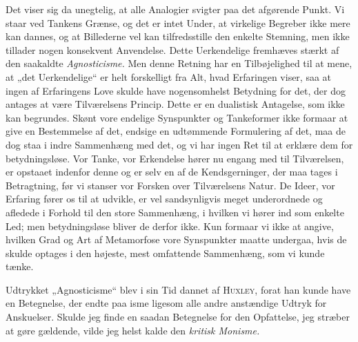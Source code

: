 \documentclass[12pt,a4paper,openany]{book}
\newcommand{\opage}[1]{\marginnote{\footnotesize\textit{[#1]}}}
\begin{document}
Det viser sig da unegtelig, at alle Analogier svigter paa det afgørende
Punkt. Vi staar ved Tankens Grænse, og det er intet Under, at virkelige
Begreber ikke mere kan dannes, og at Billederne vel kan tilfredsstille
den enkelte Stemning, men ikke tillader nogen konsekvent Anvendelse.
Dette Uerkendelige fremhæves stærkt af den saakaldte
\textit{Agnosticisme.} Men denne Retning har en Tilbøjelighed til at
mene, at „det Uerkendelige“ er helt forskelligt fra Alt, hvad Erfaringen
viser, saa at ingen af Erfaringens Love skulde have nogensomhelst
Betydning for det, der dog antages at være Tilværelsens Princip. Dette
er en dualistisk Antagelse, som ikke kan begrundes. Skønt vore endelige
Synspunkter og Tankeformer ikke formaar at give en Bestemmelse af det,
endsige en udtømmende Formulering af det, maa de dog staa i indre
Sammenhæng med det, og vi har ingen Ret til at erklære dem for
betydningsløse. Vor Tanke, vor Erkendelse hører nu engang med til
Tilværelsen, er opstaaet indenfor denne og er selv en af de
Kendsgerninger, der maa tages i Betragtning, før vi stanser vor Forsken
over Tilværelsens Natur. De Ideer, vor Erfaring fører os til at udvikle,
er vel sandsynligvis meget underordnede og afledede i Forhold til den
store Sammenhæng, i hvilken vi hører ind som enkelte Led; men
betydningsløse bliver de derfor ikke. Kun formaar vi ikke at angive,
hvilken Grad og Art af
\opage{47}Metamorfose vore Synspunkter maatte undergaa, hvis de skulde
optages i den højeste, mest omfattende Sammenhæng, som vi kunde tænke.

Udtrykket „Agnosticisme“ blev i sin Tid dannet af \textsc{Huxley}, forat
han kunde have en Betegnelse, der endte paa isme ligesom alle andre
anstændige Udtryk for Anskuelser. Skulde jeg finde en saadan Betegnelse
for den Opfattelse, jeg stræber at gøre gældende, vilde jeg helst kalde
den \textit{kritisk Monisme.}
\end{document}
